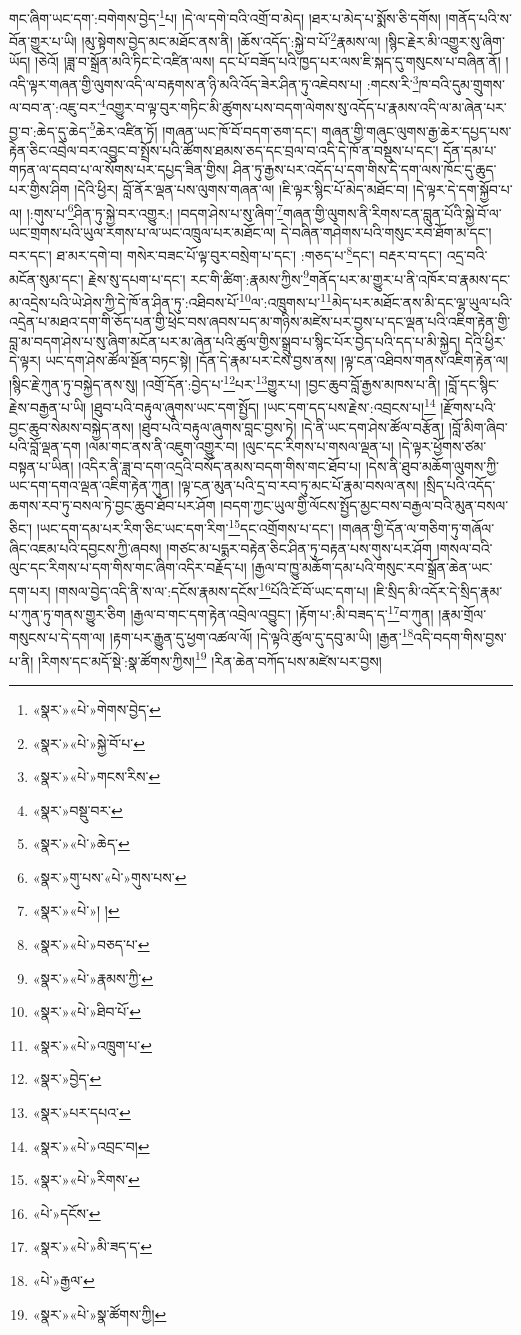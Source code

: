 གང་ཞིག་ཡང་དག་:བགེགས་བྱེད་\footnote{«སྣར་»«པེ་»གེགས་བྱེད་}པ། །དེ་ལ་དགེ་བའི་འགྲོ་བ་མེད། །ཐར་པ་མེད་པ་སྨོས་ཅི་དགོས། །གནོད་པའི་ས་བོན་གྱུར་པ་ཡི། །མུ་སྟེགས་བྱེད་མང་མཐོང་ནས་ནི། །ཆོས་འདོད་:སྐྱེ་བ་པོ་\footnote{«སྣར་»«པེ་»སྐྱེ་བོ་པ་}རྣམས་ལ། །སྙིང་རྗེར་མི་འགྱུར་སུ་ཞིག་ཡོད། །ཅེའོ། །ཟླ་བ་སྒྲོན་མའི་ཏིང་ངེ་འཛིན་ལས། དང་པོ་བཟོད་པའི་ཁྱད་པར་ལས་ཇི་སྐད་དུ་གསུངས་པ་བཞིན་ནོ། །འདི་ལྟར་གཞན་གྱི་ལུགས་འདི་ལ་བརྟགས་ན་ཉི་མའི་འོད་ཟེར་ཤིན་ཏུ་འཇེབས་པ། :གངས་རི་\footnote{«སྣར་»«པེ་»གངས་རིས་}ཁ་བའི་དུམ་གྲུགས་ལ་བབ་ན་:འཇུ་བར་\footnote{«སྣར་»བསྡུ་བར་}འགྱུར་བ་ལྟ་བུར་གཏིང་མི་ཚུགས་པས་བདག་ལེགས་སུ་འདོད་པ་རྣམས་འདི་ལ་མ་ཞེན་པར་བྱ་བ་:ཆེད་དུ་ཆེད་\footnote{«སྣར་»«པེ་»ཆེད་}ཆེར་འཛིན་ཏོ། །གཞན་ཡང་ཁོ་བོ་བདག་ཅག་དང་། གཞན་གྱི་གཞུང་ལུགས་རྒྱ་ཆེར་དཔྱད་པས་རྟེན་ཅིང་འབྲེལ་བར་འབྱུང་བ་སྤྲོས་པའི་ཚོགས་ཐམས་ཅད་དང་བྲལ་བ་འདི་དེ་ཁོ་ན་བསྡུས་པ་དང་། དོན་དམ་པ་གཏན་ལ་དབབ་པ་ལ་སོགས་པར་དཔྱད་ཟིན་གྱིས། ཤིན་ཏུ་རྒྱས་པར་འདོད་པ་དག་གིས་དེ་དག་ལས་ཁོང་དུ་ཆུད་པར་གྱིས་ཤིག །དེའི་ཕྱིར། བློ་ནོར་ལྡན་པས་ལུགས་གཞན་ལ། །ཇི་ལྟར་སྙིང་པོ་མེད་མཐོང་བ། །དེ་ལྟར་དེ་དག་སྐྱོབ་པ་ལ། །:གུས་པ་\footnote{«སྣར་»གུ་པས་«པེ་»གུས་པས་}ཤིན་ཏུ་སྐྱེ་བར་འགྱུར:། །བདག་ཤེས་པ་སུ་ཞིག་\footnote{«སྣར་»«པེ་»། །}གཞན་གྱི་ལུགས་ནི་རིགས་ངན་བླུན་པོའི་སྐྱེ་བོ་ལ་ཡང་གྲགས་པའི་ཡུལ་རགས་པ་ལ་ཡང་འཁྲུལ་པར་མཐོང་ལ། དེ་བཞིན་གཤེགས་པའི་གསུང་རབ་ཐོག་མ་དང་། བར་དང་། ཐ་མར་དགེ་བ། གསེར་བཟང་པོ་ལྟ་བུར་བསྲེག་པ་དང་། :གཅད་པ་\footnote{«སྣར་»«པེ་»བཅད་པ་}དང་། བརྡར་བ་དང་། འདྲ་བའི་མངོན་སུམ་དང་། རྗེས་སུ་དཔག་པ་དང་། རང་གི་ཚིག་:རྣམས་ཀྱིས་\footnote{«སྣར་»«པེ་»རྣམས་ཀྱི་}གནོད་པར་མ་གྱུར་པ་ནི་འཁོར་བ་རྣམས་དང་མ་འདྲེས་པའི་ཡེ་ཤེས་ཀྱི་དེ་ཁོ་ན་ཤིན་ཏུ་:འཐིབས་པོ་\footnote{«སྣར་»«པེ་»ཐིབ་པོ་}ལ་:འཁྲུགས་པ་\footnote{«སྣར་»«པེ་»འཁྲུག་པ་}མེད་པར་མཐོང་ནས་མི་དང་ལྷ་ཡུལ་པའི་འདྲེན་པ་མཐའ་དག་གི་ཅོད་པན་གྱི་ཕྲེང་བས་ཞབས་པད་མ་གཉིས་མཛེས་པར་བྱས་པ་དང་ལྡན་པའི་འཇིག་རྟེན་གྱི་བླ་མ་བདག་ཤེས་པ་སུ་ཞིག་མངོན་པར་མ་ཞེན་པའི་ཚུལ་གྱིས་སྒྲུབ་པ་སྙིང་པོར་བྱེད་པའི་དད་པ་མི་སྐྱེད། དེའི་ཕྱིར་དེ་ལྟར། ཡང་དག་ཤེས་ཚོལ་སྔོན་བཏང་སྟེ། །དོན་དེ་རྣམ་པར་ངེས་བྱས་ནས། །ལྟ་ངན་འཐིབས་གནས་འཇིག་རྟེན་ལ། །སྙིང་རྗེ་ཀུན་ཏུ་བསྐྱེད་ནས་སུ། །འགྲོ་དོན་:བྱེད་པ་\footnote{«སྣར་»བྱེད་}པར་\footnote{«སྣར་»པར་དཔའ་}གྱུར་པ། །བྱང་ཆུབ་བློ་རྒྱས་མཁས་པ་ནི། །བློ་དང་སྙིང་རྗེས་བརྒྱན་པ་ཡི། །ཐུབ་པའི་བརྟུལ་ཞུགས་ཡང་དག་སྤྱོད། །ཡང་དག་དད་པས་རྗེས་:འབྲངས་པ།\footnote{«སྣར་»«པེ་»འབྲང་བ།} །རྫོགས་པའི་བྱང་ཆུབ་སེམས་བསྐྱེད་ནས། །ཐུབ་པའི་བརྟུལ་ཞུགས་བླང་བྱས་ཏེ། །དེ་ནི་ཡང་དག་ཤེས་ཚོལ་བརྩོན། །བློ་མིག་ཞིབ་པའི་བློ་ལྡན་དག །ལམ་གང་ནས་ནི་འཇུག་འགྱུར་བ། །ལུང་དང་རིགས་པ་གསལ་ལྡན་པ། །དེ་ལྟར་ཕྱོགས་ཙམ་བསྟན་པ་ཡིན། །འདིར་ནི་ཟླ་བ་དག་འདྲའི་བསོད་ནམས་བདག་གིས་གང་ཐོབ་པ། །དེས་ནི་ཐུབ་མཆོག་ལུགས་ཀྱི་ཡང་དག་དགའ་ལྡན་འཇིག་རྟེན་ཀུན། །ལྟ་ངན་མུན་པའི་དྲ་བ་རབ་ཏུ་མང་པོ་རྣམ་བསལ་ནས། །སྲིད་པའི་འདོད་ཆགས་རབ་ཏུ་བསལ་ཏེ་བྱང་ཆུབ་ཐོབ་པར་ཤོག །བདག་ཀྱང་ཡུལ་གྱི་ལོངས་སྤྱོད་མྱང་བས་བརྒྱལ་བའི་མུན་བསལ་ཅིང་། །ཡང་དག་དམ་པར་རིག་ཅིང་ཡང་དག་རིག་\footnote{«སྣར་»«པེ་»རིགས་}དང་འགྲོགས་པ་དང་། །གཞན་གྱི་དོན་ལ་གཅིག་ཏུ་གཞོལ་ཞིང་འཇམ་པའི་དབྱངས་ཀྱི་ཞབས། །གཙང་མ་པདྨར་བརྟེན་ཅིང་ཤིན་ཏུ་བརྟན་པས་གུས་པར་ཤོག །གསལ་བའི་ལུང་དང་རིགས་པ་དག་གིས་གང་ཞིག་འདིར་བརྗོད་པ། །རྒྱལ་བ་ཁྱུ་མཆོག་དམ་པའི་གསུང་རབ་སྒྲོན་ཆེན་ཡང་དག་པར། །གསལ་བྱེད་འདི་ནི་ས་ལ་:དངོས་རྣམས་དངོས་\footnote{«པེ་»དངོས་}པོའི་ངོ་བོ་ཡང་དག་པ། །ཇི་སྲིད་མི་འདོར་དེ་སྲིད་རྣམ་པ་ཀུན་ཏུ་གནས་གྱུར་ཅིག །རྒྱལ་བ་གང་དག་རྟེན་འབྲེལ་འབྱུང་། །རྟོག་པ་:མི་བཟད་ད་\footnote{«སྣར་»«པེ་»མི་ཟད་ད་}བ་ཀུན། །རྣམ་གྲོལ་གསུངས་པ་དེ་དག་ལ། །རྟག་པར་རྒྱུན་དུ་ཕྱག་འཚལ་ལོ། །དེ་ལྟའི་ཚུལ་དུ་དབུ་མ་ཡི། །རྒྱན་\footnote{«པེ་»རྒྱལ་}འདི་བདག་གིས་བྱས་པ་ནི། །རིགས་དང་མདོ་སྡེ་:སྣ་ཚོགས་ཀྱིས།\footnote{«སྣར་»«པེ་»སྣ་ཚོགས་ཀྱི།} །རིན་ཆེན་བཀོད་པས་མཛེས་པར་བྱས། 